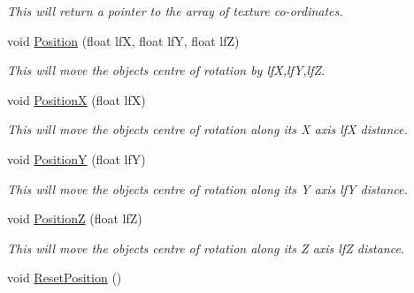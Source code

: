 \begin{DoxyCompactItemize}
\begin{DoxyCompactList}\small\item\em This will return a pointer to the array of texture co-\/ordinates. \end{DoxyCompactList}\item 
\hypertarget{classc_mesh_a022d36f1b2f456b5edb50d32956960e0}{
void \hyperlink{classc_mesh_a022d36f1b2f456b5edb50d32956960e0}{Position} (float lfX, float lfY, float lfZ)}
\label{classc_mesh_a022d36f1b2f456b5edb50d32956960e0}

\begin{DoxyCompactList}\small\item\em This will move the objects centre of rotation by lfX,lfY,lfZ. \end{DoxyCompactList}\item 
\hypertarget{classc_mesh_a4d0f5cbdb12f1bc7fb8899c61d2328d5}{
void \hyperlink{classc_mesh_a4d0f5cbdb12f1bc7fb8899c61d2328d5}{PositionX} (float lfX)}
\label{classc_mesh_a4d0f5cbdb12f1bc7fb8899c61d2328d5}

\begin{DoxyCompactList}\small\item\em This will move the objects centre of rotation along its X axis lfX distance. \end{DoxyCompactList}\item 
\hypertarget{classc_mesh_a031dd39f3c8aa1643a978b42bfc68ddc}{
void \hyperlink{classc_mesh_a031dd39f3c8aa1643a978b42bfc68ddc}{PositionY} (float lfY)}
\label{classc_mesh_a031dd39f3c8aa1643a978b42bfc68ddc}

\begin{DoxyCompactList}\small\item\em This will move the objects centre of rotation along its Y axis lfY distance. \end{DoxyCompactList}\item 
\hypertarget{classc_mesh_a75062dccdd861877dd206f81ac2f9ec0}{
void \hyperlink{classc_mesh_a75062dccdd861877dd206f81ac2f9ec0}{PositionZ} (float lfZ)}
\label{classc_mesh_a75062dccdd861877dd206f81ac2f9ec0}

\begin{DoxyCompactList}\small\item\em This will move the objects centre of rotation along its Z axis lfZ distance. \end{DoxyCompactList}\item 
\hypertarget{classc_mesh_a6b4d72718fa9a90fae3ee30dbe5f2575}{
void \hyperlink{classc_mesh_a6b4d72718fa9a90fae3ee30dbe5f2575}{ResetPosition} ()}
\label{classc_mesh_a6b4d72718fa9a90fae3ee30dbe5f2575}


\end{DoxyCompactItemize}
